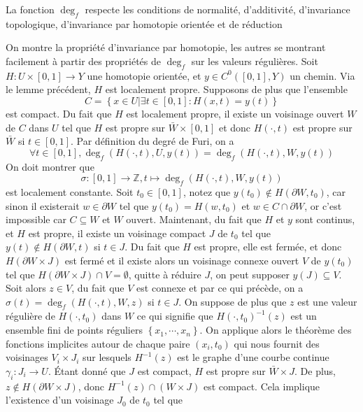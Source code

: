 \documentclass[memoire.tex]{subfiles}
\begin{document}
\begin{theobox}{}{}
    La fonction $\deg_f$ respecte les conditions de normalité, d'additivité, d'invariance topologique, d'invariance par homotopie orientée et de réduction
\end{theobox}
\begin{preuve}
    On montre la propriété d'invariance par homotopie, les autres se montrant facilement à partir des propriétés de $\deg_f$ sur les valeurs régulières. Soit $H: U\times [0,1]\rightarrow Y$ une homotopie orientée, et $y\in C^0([0,1],Y)$ un chemin. Via le lemme précédent, $H$ est localement propre. Supposons de plus que l'ensemble
    \begin{equation*}
        C=\left\{x\in U\big| \exists t\in [0,1]: H(x,t)=y(t)\right\}
    \end{equation*}
    est compact. Du fait que $H$ est localement propre, il existe un voisinage ouvert $W$ de $C$ dans $U$ tel que $H$ est propre sur $\bar{W}\times [0,1]$ et donc $H(\cdot,t)$ est propre sur $\bar{W}$ si $t\in [0,1]$. Par définition du degré de Furi, on a
    \begin{equation*}
        \forall t\in [0,1],
        \deg_f(H(\cdot,t),U,y(t))=
        \deg_f(H(\cdot,t),W,y(t))
    \end{equation*}
    On doit montrer que
    \begin{equation*}
        \sigma : [0,1]\rightarrow \mathbb{Z}, t\mapsto \deg_f(H(\cdot,t),W,y(t))
    \end{equation*}
    est localement constante. Soit $t_0\in [0,1]$, notez que $y(t_0)\notin H(\partial W,t_0)$, car sinon il existerait $w\in \partial W$ tel que $y(t_0)=H(w,t_0)$ et $w\in C\cap \partial W$, or  c'est impossible car $C\subseteq W$ et $W$ ouvert. Maintenant, du fait que $H$ et $y$ sont continus, et $H$ est propre, il existe un voisinage compact $J$ de $t_0$ tel que $y(t)\notin H(\partial W,t)$ si $t\in J$. Du fait que $H$ est propre, elle est fermée, et donc $H(\partial W\times J)$ est fermé et il existe alors un voisinage connexe ouvert $V$ de $y(t_0)$ tel que $H(\partial W\times J)\cap V=\emptyset$, quitte à réduire $J$, on peut supposer $y(J)\subseteq V$. Soit alors $z\in V$, du fait que $V$ est connexe et par ce qui précède, on a $\sigma(t)=\deg_f(H(\cdot,t),W,z)$ si $t\in J$. On suppose de plus que $z$ est une valeur régulière de $H(\cdot,t_0)$ dans $W$ ce qui signifie que $H(\cdot,t_0)^{-1}(z)$ est un ensemble fini de points réguliers $\left\{x_1,\cdots,x_n\right\}$. On applique alors le théorème des fonctions implicites autour de chaque paire $(x_i,t_0)$ qui nous fournit des voisinages $V_i\times J_i$ sur lesquels $H^{-1}(z)$ est le graphe d'une courbe continue $\gamma_i: J_i\rightarrow U$. Étant donné que $J$ est compact, $H$ est propre sur $\bar{W}\times J$. De plus, $z\notin H(\partial W\times J)$, donc $H^{-1}(z)\cap (W\times J)$ est compact. Cela implique l'existence d'un voisinage $J_0$ de $t_0$ tel que

\end{preuve}
\end{document}

